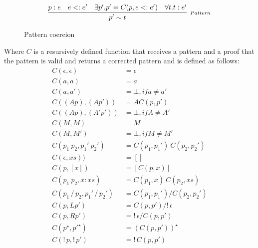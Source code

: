 \begin{figure*}[ht]
    \[
        \begin{array}{ccc}
            \multicolumn{3}{c}{
                \infer[_{Pattern}]
                    {p' \sim t}
                    {p : e & e <: e' & \exists p' . p' = C(p, e <: e') & \forall t. t:e'}
            }
        \end{array}
    \]
    \centering
    \caption{Pattern coercion}
    \label{fig:pattern-coercion}
\end{figure*}
Where \(C\) is a resursively defined function that receives a pattern and a proof
that the pattern is valid and returns a corrected pattern and is defined as follows:
\[
    \begin{array}{ll}
        C(\epsilon, \epsilon)             & = \epsilon \\
        C(a, a)                           & = a \\
        C(a, a')                          & = \bot, if a \neq a' \\
        C((A p), (A p'))                  & = A C(p, p') \\
        C((A p), (A' p'))                 & = \bot, if A \neq A' \\
        C(M, M)                           & = M \\
        C(M, M')                          & = \bot, if M \neq M' \\
        C(p_1\:p_2, p_1'\:p_2')           & = C(p_1, p_1')\:C(p_2, p_2') \\
        C(\epsilon, xs))                  & = [] \\
        C(p, [x])                         & = [C(p, x)] \\
        C(p_1\:p_2, x:xs)                 & = C(p_1, x) \: C(p_2, xs) \\
        C(p_1 \,/\, p_2, p_1' \,/\, p_2') & = C(p_1, p_1') / C(p_2, p_2') \\
        C(p, L p')                        & = C(p, p') / !\,\epsilon \\
        C(p, R p')                        & = !\,\epsilon / C(p, p') \\
        C(p^\star, {p'}^\star)            & = (C(p, p'))^\star \\
        C(!\,p, !\,p')                    & = !\,C(p, p') \\
        
    \end{array}
\]


